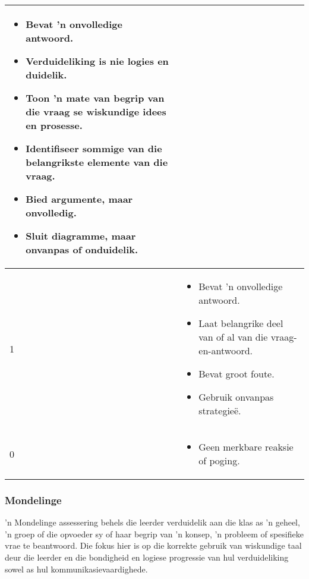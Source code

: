 \begin{table}[H]
\begin{center}
\begin{tabular}{|p{3cm}|p{8.5cm}|}
\begin{itemize}[noitemsep]
\item
  Bevat 'n onvolledige antwoord.
\item
  Verduideliking is nie logies en duidelik.
\item
  Toon 'n mate van begrip van die vraag se wiskundige idees en prosesse.
\item
  Identifiseer sommige van die belangrikste elemente van die vraag.
\item
  Bied argumente, maar onvolledig.
\item
  Sluit diagramme, maar onvanpas of onduidelik.
\end{itemize} \\ \hline
1 &
\begin{itemize}[noitemsep]
\item
  Bevat 'n onvolledige antwoord.
\item
  Laat belangrike deel van of al van die vraag-en-antwoord.
\item
  Bevat groot foute.
\item
  Gebruik onvanpas strategie\"{e}.
\end{itemize} \\ \hline
0 &
\begin{itemize}[noitemsep]
\item
Geen merkbare reaksie of poging.
\end{itemize} \\ \hline
  \end{tabular}

 \end{center}

\end{table}

\subsubsection{Mondelinge}
'n Mondelinge assessering behels die leerder verduidelik aan die klas as 'n geheel, 'n groep of die opvoeder sy of haar begrip van 'n konsep, 'n probleem of spesifieke vrae te beantwoord. Die fokus hier is op die korrekte gebruik van wiskundige taal deur die leerder en die bondigheid en logiese progressie van hul verduideliking sowel as hul kommunikasievaardighede.\par


